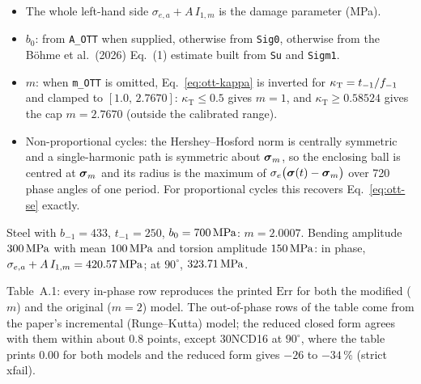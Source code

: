 \begin{itemize}
\item The whole left-hand side $\sigma_{e,a}+A\,I_{1,m}$ is the damage parameter (MPa).
\item $b_0$: from \texttt{A\_OTT} when supplied, otherwise from \texttt{Sig0}, otherwise from the
  B\"ohme et al.\ (2026) Eq.~(1) estimate built from \texttt{Su} and \texttt{Sigm1}.
\item $m$: when \texttt{m\_OTT} is omitted, Eq.~\eqref{eq:ott-kappa} is inverted for
  $\kappa_{\mathrm{T}}=t_{-1}/f_{-1}$ and clamped to $[1.0,\,2.7670]$: $\kappa_{\mathrm{T}}\le0.5$ gives
  $m=1$, and $\kappa_{\mathrm{T}}\ge0.58524$ gives the cap $m=2.7670$ (outside the calibrated range).
\item Non-proportional cycles: the Hershey--Hosford norm is centrally symmetric and a single-harmonic
  path is symmetric about $\boldsymbol\sigma_m$, so the enclosing ball is centred at $\boldsymbol\sigma_m$ and its radius is the
  maximum of $\sigma_e\bigl(\boldsymbol\sigma(t)-\boldsymbol\sigma_m\bigr)$ over 720 phase angles of one period. For proportional
  cycles this recovers Eq.~\eqref{eq:ott-se} exactly.
\end{itemize}

 Steel with $b_{-1}=433$, $t_{-1}=250$, $b_0=700\,\mathrm{MPa}$: $m=2.0007$. Bending
amplitude $300\,\mathrm{MPa}$ with mean $100\,\mathrm{MPa}$ and torsion amplitude $150\,\mathrm{MPa}$: in phase,
$\sigma_{e,a}+A\,I_{1,m}=420.57\,\mathrm{MPa}$; at $90^\circ$, $323.71\,\mathrm{MPa}$.

 Table~A.1: every in-phase row reproduces the printed $\mathrm{Err}$ for both the
modified ($m$) and the original ($m=2$) model. The out-of-phase rows of the table come from the
paper's incremental (Runge--Kutta) model; the reduced closed form agrees with them within about
0.8 points, except 30NCD16 at $90^\circ$, where the table prints 0.00 for both models and the reduced
form gives $-26$ to $-34\,\%$ (strict xfail).
